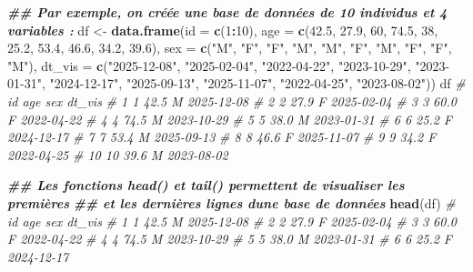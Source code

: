 \documentclass[
]{book}
\newenvironment{Shaded}{\begin{snugshade}}{\end{snugshade}}
\newcommand{\AttributeTok}[1]{\textcolor[rgb]{0.13,0.29,0.53}{#1}}
\newcommand{\CommentTok}[1]{\textcolor[rgb]{0.56,0.35,0.01}{\textit{#1}}}
\newcommand{\DecValTok}[1]{\textcolor[rgb]{0.00,0.00,0.81}{#1}}
\newcommand{\DocumentationTok}[1]{\textcolor[rgb]{0.56,0.35,0.01}{\textbf{\textit{#1}}}}
\newcommand{\FloatTok}[1]{\textcolor[rgb]{0.00,0.00,0.81}{#1}}
\newcommand{\FunctionTok}[1]{\textcolor[rgb]{0.13,0.29,0.53}{\textbf{#1}}}
\newcommand{\NormalTok}[1]{#1}
\newcommand{\OtherTok}[1]{\textcolor[rgb]{0.56,0.35,0.01}{#1}}
\newcommand{\SpecialCharTok}[1]{\textcolor[rgb]{0.81,0.36,0.00}{\textbf{#1}}}
\newcommand{\StringTok}[1]{\textcolor[rgb]{0.31,0.60,0.02}{#1}}
\begin{document}
\begin{Shaded}
\begin{Highlighting}[]
\DocumentationTok{\#\# Par exemple, on créée une base de données de 10 individus et 4 variables : }
\NormalTok{df }\OtherTok{\textless{}{-}} \FunctionTok{data.frame}\NormalTok{(}\AttributeTok{id =} \FunctionTok{c}\NormalTok{(}\DecValTok{1}\SpecialCharTok{:}\DecValTok{10}\NormalTok{),}
                 \AttributeTok{age =} \FunctionTok{c}\NormalTok{(}\FloatTok{42.5}\NormalTok{, }\FloatTok{27.9}\NormalTok{, }\DecValTok{60}\NormalTok{, }\FloatTok{74.5}\NormalTok{, }\DecValTok{38}\NormalTok{, }\FloatTok{25.2}\NormalTok{, }\FloatTok{53.4}\NormalTok{, }\FloatTok{46.6}\NormalTok{, }\FloatTok{34.2}\NormalTok{, }\FloatTok{39.6}\NormalTok{), }
                 \AttributeTok{sex =} \FunctionTok{c}\NormalTok{(}\StringTok{"M"}\NormalTok{, }\StringTok{"F"}\NormalTok{, }\StringTok{"F"}\NormalTok{, }\StringTok{"M"}\NormalTok{, }\StringTok{"M"}\NormalTok{, }\StringTok{"F"}\NormalTok{, }\StringTok{"M"}\NormalTok{, }\StringTok{"F"}\NormalTok{, }\StringTok{"F"}\NormalTok{, }\StringTok{"M"}\NormalTok{),}
                 \AttributeTok{dt\_vis =} \FunctionTok{c}\NormalTok{(}\StringTok{"2025{-}12{-}08"}\NormalTok{, }\StringTok{"2025{-}02{-}04"}\NormalTok{, }\StringTok{"2022{-}04{-}22"}\NormalTok{, }
                            \StringTok{"2023{-}10{-}29"}\NormalTok{, }\StringTok{"2023{-}01{-}31"}\NormalTok{, }\StringTok{"2024{-}12{-}17"}\NormalTok{, }
                            \StringTok{"2025{-}09{-}13"}\NormalTok{, }\StringTok{"2025{-}11{-}07"}\NormalTok{, }\StringTok{"2022{-}04{-}25"}\NormalTok{, }
                            \StringTok{"2023{-}08{-}02"}\NormalTok{))}
\NormalTok{df}
\CommentTok{\#    id  age sex     dt\_vis}
\CommentTok{\# 1   1 42.5   M 2025{-}12{-}08}
\CommentTok{\# 2   2 27.9   F 2025{-}02{-}04}
\CommentTok{\# 3   3 60.0   F 2022{-}04{-}22}
\CommentTok{\# 4   4 74.5   M 2023{-}10{-}29}
\CommentTok{\# 5   5 38.0   M 2023{-}01{-}31}
\CommentTok{\# 6   6 25.2   F 2024{-}12{-}17}
\CommentTok{\# 7   7 53.4   M 2025{-}09{-}13}
\CommentTok{\# 8   8 46.6   F 2025{-}11{-}07}
\CommentTok{\# 9   9 34.2   F 2022{-}04{-}25}
\CommentTok{\# 10 10 39.6   M 2023{-}08{-}02}


\DocumentationTok{\#\# Les fonctions head() et tail() permettent de visualiser les premières}
\DocumentationTok{\#\# et les dernières lignes d\textquotesingle{}une base de données}
\FunctionTok{head}\NormalTok{(df)}
\CommentTok{\#   id  age sex     dt\_vis}
\CommentTok{\# 1  1 42.5   M 2025{-}12{-}08}
\CommentTok{\# 2  2 27.9   F 2025{-}02{-}04}
\CommentTok{\# 3  3 60.0   F 2022{-}04{-}22}
\CommentTok{\# 4  4 74.5   M 2023{-}10{-}29}
\CommentTok{\# 5  5 38.0   M 2023{-}01{-}31}
\CommentTok{\# 6  6 25.2   F 2024{-}12{-}17}


\end{Highlighting}
\end{Shaded}
\end{document}
